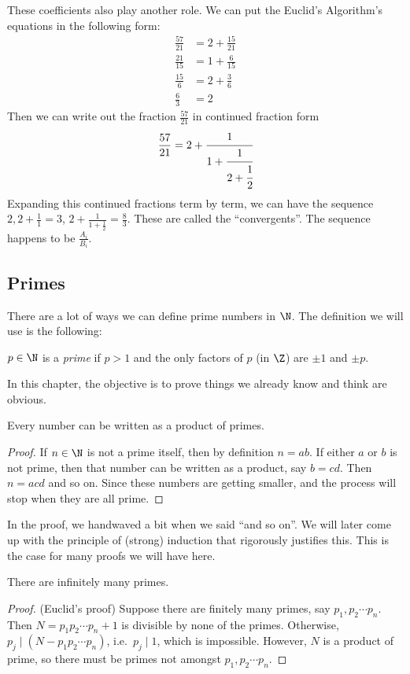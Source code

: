 \documentclass[a4paper]{article}
\begin{document}
These coefficients also play another role. We can put the Euclid's Algorithm's equations in the following form:
\begin{align*}
  \frac{57}{21} &= 2 + \frac{15}{21}\\
  \frac{21}{15} &= 1 + \frac{6}{15}\\
  \frac{15}{6} &= 2 + \frac{3}{6}\\
  \frac{6}{3} &= 2
\end{align*}
Then we can write out the fraction $\frac{57}{21}$ in continued fraction form
\[
  \frac{57}{21} = 2 + \cfrac{1}{1 + \cfrac{1}{2 + \cfrac{1}{2}}}
\]
Expanding this continued fractions term by term, we can have the sequence $2, 2 + \frac{1}{1} = 3$, $2 + \frac{1}{1 + \frac{1}{2}} = \frac{8}{3}$. These are called the ``convergents''. The sequence happens to be $\frac{A_i}{B_i}$.

\subsection{Primes}
There are a lot of ways we can define prime numbers in $\N$. The definition we will use is the following:
\begin{defi}
  $p\in \N$ is a \emph{prime} if $p > 1$ and the only factors of $p$ (in $\Z$) are $\pm 1$ and $\pm p$.
\end{defi}
In this chapter, the objective is to prove things we already know and think are obvious.
\begin{thm}
  Every number can be written as a product of primes.
\end{thm}

\begin{proof}
  If $n\in \N$ is not a prime itself, then by definition $n = ab$. If either $a$ or $b$ is not prime, then that number can be written as a product, say $b = cd$. Then $n = acd$ and so on. Since these numbers are getting smaller, and the process will stop when they are all prime.
\end{proof}
In the proof, we handwaved a bit when we said ``and so on''. We will later come up with the principle of (strong) induction that rigorously justifies this. This is the case for many proofs we will have here.

\begin{thm}
  There are infinitely many primes.
\end{thm}

\begin{proof}
  (Euclid's proof) Suppose there are finitely many primes, say $p_1, p_2 \cdots p_n$. Then $N = p_1p_2\cdots p_n + 1$ is divisible by none of the primes. Otherwise, $p_j\mid (N - p_1p_2\cdots p_n)$, i.e.\ $p_j\mid 1$, which is impossible. However, $N$ is a product of prime, so there must be primes not amongst $p_1, p_2\cdots p_n$.
\end{proof}
\end{document}
